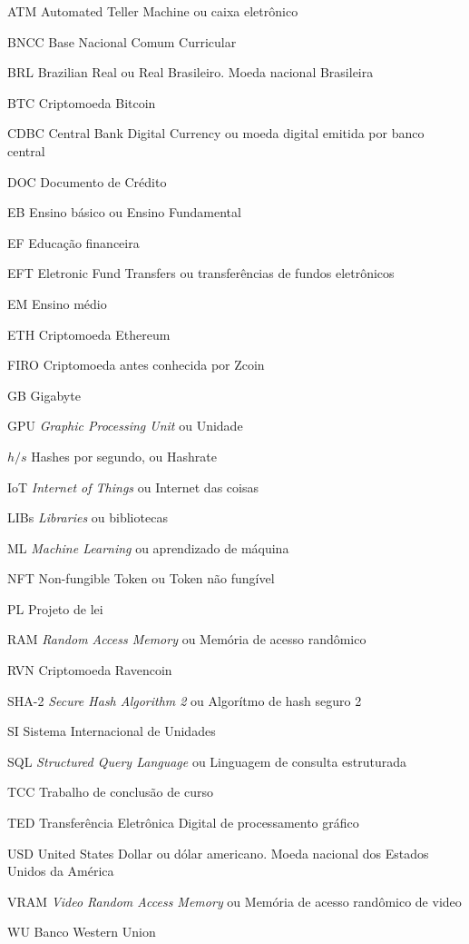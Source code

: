 

\begin{siglas}
	\item[ATM] Automated Teller Machine ou caixa eletrônico
	\item[BNCC] Base Nacional Comum Curricular
	\item[BRL] Brazilian Real ou Real Brasileiro. Moeda nacional Brasileira
	\item[BTC] Criptomoeda Bitcoin
	\item[CDBC] Central Bank Digital Currency ou moeda digital emitida por banco central
	\item[DOC] Documento de Crédito
	\item[EB] Ensino básico ou Ensino Fundamental
	\item[EF] Educação financeira
	\item[EFT] Eletronic Fund Transfers ou transferências de fundos eletrônicos
	\item[EM] Ensino médio
	\item[ETH] Criptomoeda Ethereum
	\item[FIRO] Criptomoeda antes conhecida por Zcoin
	\item[GB] Gigabyte
	\item[GPU] \textit{Graphic Processing Unit} ou Unidade
	\item[$ h/s $] Hashes por segundo, ou Hashrate
	\item[IoT] \textit{Internet of Things} ou Internet das coisas
	\item[LIBs] \textit{Libraries} ou bibliotecas
	\item[ML] \textit{Machine Learning} ou aprendizado de máquina
	\item[NFT] Non-fungible Token ou Token não fungível
	\item[PL] Projeto de lei
	\item[RAM] \textit{Random Access Memory} ou Memória de acesso randômico
	\item[RVN] Criptomoeda Ravencoin
	\item[SHA-2] \textit{Secure Hash Algorithm 2} ou Algorítmo de hash seguro 2
	\item[SI] Sistema Internacional de Unidades
	\item[SQL] \textit{Structured Query Language} ou Linguagem de consulta estruturada
	\item[TCC] Trabalho de conclusão de curso
	\item[TED] Transferência Eletrônica Digital de processamento gráfico
	\item[USD] United States Dollar ou dólar americano. Moeda nacional dos Estados Unidos da América 
	\item[VRAM] \textit{Video Random Access Memory} ou Memória de acesso randômico de video 
	\item[WU] Banco Western Union
\end{siglas}


